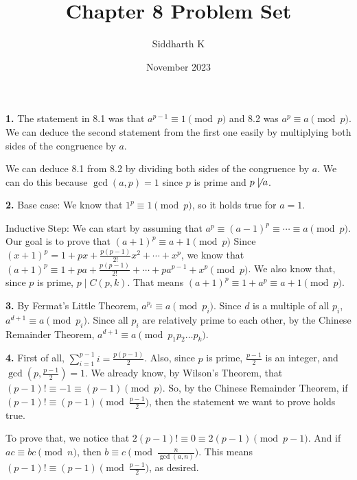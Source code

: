 \documentclass{article}
\title{Chapter 8 Problem Set}
\author{Siddharth K}
\date{November 2023}
\begin{document}
\maketitle

\textbf{1.} The statement in 8.1 was that $a^{p - 1} \equiv 1 \pmod{p}$ and 8.2 was $a^p \equiv a \pmod{p}$. We can deduce the second statement from the first one easily by multiplying both sides of the congruence by $a$.
\newline

We can deduce 8.1 from 8.2 by dividing both sides of the congruence by $a$. We can do this because $\gcd(a, p) = 1$ since $p$ is prime and $p \not \mid a$.
\newline

\textbf{2.} Base case:
We know that $1^p \equiv 1 \pmod{p}$, so it holds true for $a = 1$.
\newline

Inductive Step:
We can start by assuming that $a^p \equiv (a - 1)^p \equiv \cdots \equiv a \pmod{p}.$ Our goal is to prove that $(a + 1)^p \equiv a + 1 \pmod{p}$ Since $(x + 1)^p = 1 + px + \frac{p(p - 1)}{2!}x^2 + \cdots + x^p$, we know that $(a + 1)^p \equiv 1 + pa + \frac{p(p - 1)}{2!} + \cdots + pa^{p - 1} + x^p \pmod{p}$. We also know that, since $p$ is prime, $p \mid C(p, k)$. That means $(a + 1)^p \equiv 1 + a^p \equiv a + 1 \pmod{p}$.
\newline

\textbf{3.} By Fermat's Little Theorem, $a^{p_i} \equiv a \pmod{p_i}$. Since $d$ is a multiple of all $p_i$, $a^{d + 1} \equiv a \pmod{p_i}$. Since all $p_i$ are relatively prime to each other, by the Chinese Remainder Theorem, $a^{d + 1} \equiv a \pmod{p_1p_2\ldots p_k}$.
\newline

\textbf{4.} First of all, $\sum_{i = 1}^{p - 1} i = \frac{p(p - 1)}{2}$. Also, since $p$ is prime, $\frac{p - 1}{2}$ is an integer, and $\gcd(p, \frac{p - 1}{2}) = 1$. We already know, by Wilson's Theorem, that $(p - 1)! \equiv -1 \equiv (p - 1) \pmod{p}$. So, by the Chinese Remainder Theorem, if $(p - 1)! \equiv (p - 1) \pmod{\frac{p - 1}{2}}$, then the statement we want to prove holds true.
\newline

To prove that, we notice that $2(p - 1)! \equiv 0 \equiv 2(p - 1) \pmod{p - 1}$. And if $ac \equiv bc \pmod{n}$, then $b \equiv c \pmod{\frac{n}{\gcd(a, n)}}$. This means $(p - 1)! \equiv (p - 1) \pmod{\frac{p - 1}{2}}$, as desired.
\newline
\end{document}
